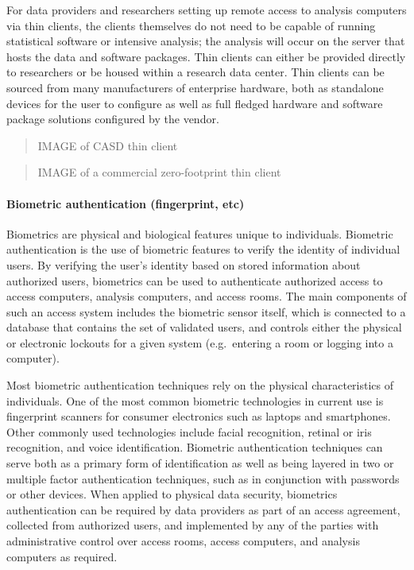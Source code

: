 For data providers and researchers setting up remote access to analysis
computers via thin clients, the clients themselves do not need to be
capable of running statistical software or intensive analysis; the
analysis will occur on the server that hosts the data and software
packages. Thin clients can either be provided directly to researchers or
be housed within a research data center. Thin clients can be sourced
from many manufacturers of enterprise hardware, both as standalone
devices for the user to configure as well as full fledged hardware and
software package solutions configured by the vendor.

\begin{quote}
IMAGE of CASD thin client
\end{quote}

\begin{quote}
IMAGE of a commercial zero-footprint thin client
\end{quote}

\hypertarget{biometric-authentication-fingerprint-etc}{%
\paragraph{Biometric authentication (fingerprint,
etc)}\label{biometric-authentication-fingerprint-etc}}

Biometrics are physical and biological features unique to individuals.
Biometric authentication is the use of biometric features to verify the
identity of individual users. By verifying the user's identity based on
stored information about authorized users, biometrics can be used to
authenticate authorized access to access computers, analysis computers,
and access rooms. The main components of such an access system includes
the biometric sensor itself, which is connected to a database that
contains the set of validated users, and controls either the physical or
electronic lockouts for a given system (e.g.~entering a room or logging
into a computer).

Most biometric authentication techniques rely on the physical
characteristics of individuals. One of the most common biometric
technologies in current use is fingerprint scanners for consumer
electronics such as laptops and smartphones. Other commonly used
technologies include facial recognition, retinal or iris recognition,
and voice identification. Biometric authentication techniques can serve
both as a primary form of identification as well as being layered in two
or multiple factor authentication techniques, such as in conjunction
with passwords or other devices. When applied to physical data security,
biometrics authentication can be required by data providers as part of
an access agreement, collected from authorized users, and implemented by
any of the parties with administrative control over access rooms, access
computers, and analysis computers as required.

